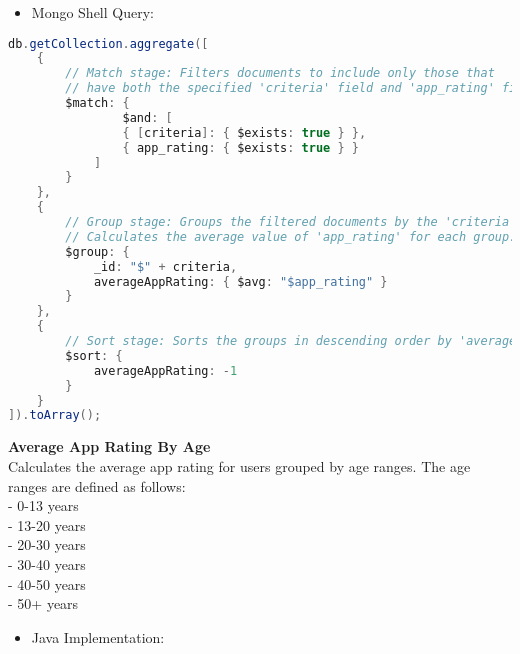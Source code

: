     \begin{itemize}
        \item Mongo Shell Query:
    \end{itemize}

\begin{mdframed}[style=customstyle]
\begin{lstlisting}[language=java]
db.getCollection.aggregate([
    { 
        // Match stage: Filters documents to include only those that 
        // have both the specified 'criteria' field and 'app_rating' field.
        $match: { 
                $and: [
                { [criteria]: { $exists: true } },
                { app_rating: { $exists: true } }
            ]
        } 
    },
    { 
        // Group stage: Groups the filtered documents by the 'criteria' field.
        // Calculates the average value of 'app_rating' for each group.
        $group: { 
            _id: "$" + criteria, 
            averageAppRating: { $avg: "$app_rating" }
        } 
    },
    { 
        // Sort stage: Sorts the groups in descending order by 'averageAppRating'.
        $sort: { 
            averageAppRating: -1 
        } 
    }
]).toArray();\end{lstlisting}
\end{mdframed}

\textbf{Average App Rating By Age}\\
Calculates the average app rating for users grouped by age ranges.
The age ranges are defined as follows:\\
- 0-13 years\\
- 13-20 years\\
- 20-30 years\\
- 30-40 years\\
- 40-50 years\\
- 50+ years
\begin{itemize}
    \item Java Implementation:
\end{itemize}

